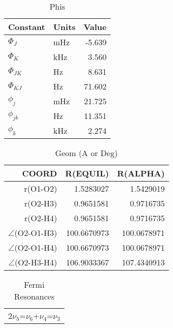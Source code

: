 \documentclass{article}
\begin{document}
\begin{table}[ht]
\centering
\caption{Phis}
\begin{tabular}{llr}
Constant & Units & Value\\
\hline
$\Phi_{J}$ & mHz & -5.639\\
$\Phi_{K}$ & kHz & 3.560\\
$\Phi_{JK}$ & Hz & 8.631\\
$\Phi_{KJ}$ & Hz & 71.602\\
$\phi_{j}$ & mHz & 21.725\\
$\phi_{jk}$ & Hz & 11.351\\
$\phi_{k}$ & kHz & 2.274\\
\end{tabular}
\end{table}

\begin{table}[ht]
\centering
\caption{Geom (A or Deg)}
\begin{tabular}{rrr}
COORD & R(EQUIL) & R(ALPHA)\\
\hline
r(O1-O2) & 1.5283027 & 1.5429019\\
r(O2-H3) & 0.9651581 & 0.9716735\\
r(O2-H4) & 0.9651581 & 0.9716735\\
$\angle$(O2-O1-H3) & 100.6670973 & 100.0678971\\
$\angle$(O2-O1-H4) & 100.6670973 & 100.0678971\\
$\angle$(O2-H3-H4) & 106.9033367 & 107.4340913\\
\end{tabular}
\end{table}

\begin{table}[ht]
\centering
\caption{Fermi Resonances}
\begin{tabular}{c}
2$\nu_5$=$\nu_6$+$\nu_4$=$\nu_3$\\
\end{tabular}
\end{table}
\end{document}
